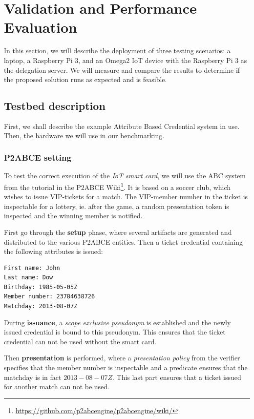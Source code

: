 \documentclass[journal]{IEEEtran}
\begin{document}
\section{Validation and Performance Evaluation}\label{ch:validation}

In this section, we will describe the deployment of three testing scenarios: a laptop, a Raspberry Pi 3, and an Omega2 IoT device with the Raspberry Pi 3 as the delegation server. We will measure and compare the results to determine if the proposed solution runs as expected and is feasible.

\subsection{Testbed description}

First, we shall describe the example Attribute Based Credential system in use. Then, the hardware we will use in our benchmarking.

\subsubsection{P2ABCE setting}

To test the correct execution of the \textit{IoT smart card}, we will use the ABC system from the tutorial in the P2ABCE Wiki\footnote{\url{https://github.com/p2abcengine/p2abcengine/wiki/}}. It is based on a soccer club, which wishes to issue VIP-tickets for a match. The VIP-member number in the ticket is inspectable for a lottery, ie. after the game, a random presentation token is inspected and the winning member is notified.

First go through the \textbf{setup} phase, where several artifacts are generated and distributed to the various P2ABCE entities. Then a ticket credential containing the following attributes is issued:

\begin{verbatim}
First name: John
Last name: Dow
Birthday: 1985-05-05Z
Member number: 23784638726
Matchday: 2013-08-07Z
\end{verbatim}

During \textbf{issuance}, a \textit{scope exclusive pseudonym} is established and the newly issued credential is bound to this pseudonym. This ensures that the ticket credential can not be used without the smart card.

Then \textbf{presentation} is performed, where a \textit{presentation policy} from the verifier specifies that the member number is inspectable and a predicate ensures that the matchday is in fact $2013-08-07Z$. This last part ensures that a ticket issued for another match can not be used.
\end{document}
